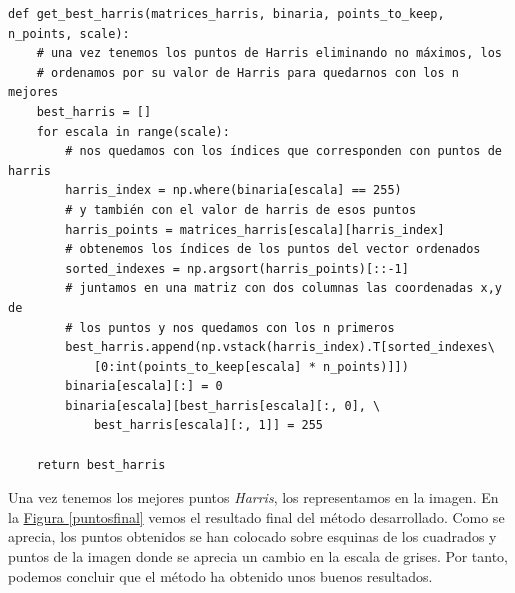 \documentclass[11pt,a4paper]{article}
\theoremstyle{plain}
\theoremstyle{definition}
\begin{document}
\begin{verbatim}
def get_best_harris(matrices_harris, binaria, points_to_keep, n_points, scale):
    # una vez tenemos los puntos de Harris eliminando no máximos, los 
    # ordenamos por su valor de Harris para quedarnos con los n mejores
    best_harris = []
    for escala in range(scale):
        # nos quedamos con los índices que corresponden con puntos de harris
        harris_index = np.where(binaria[escala] == 255)
        # y también con el valor de harris de esos puntos
        harris_points = matrices_harris[escala][harris_index]
        # obtenemos los índices de los puntos del vector ordenados
        sorted_indexes = np.argsort(harris_points)[::-1]
        # juntamos en una matriz con dos columnas las coordenadas x,y de 
        # los puntos y nos quedamos con los n primeros
        best_harris.append(np.vstack(harris_index).T[sorted_indexes\
            [0:int(points_to_keep[escala] * n_points)]])
        binaria[escala][:] = 0
        binaria[escala][best_harris[escala][:, 0], \
            best_harris[escala][:, 1]] = 255

    return best_harris
\end{verbatim}

Una vez tenemos los mejores puntos \textit{Harris}, los representamos en la imagen. En la \hyperref[puntosfinal]{Figura \ref*{puntosfinal}} vemos el resultado final del método desarrollado. Como se aprecia, los puntos obtenidos se han colocado sobre esquinas de los cuadrados y puntos de la imagen donde se aprecia un cambio en la escala de grises. Por tanto, podemos concluir que el método ha obtenido unos buenos resultados.
\end{document}
